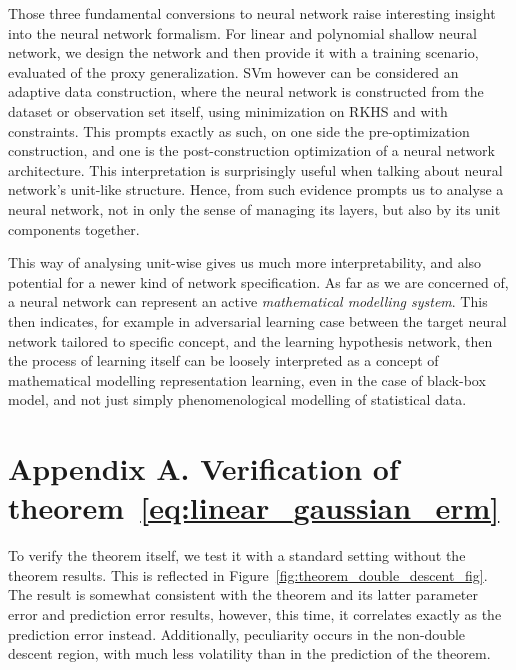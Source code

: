 \documentclass[10pt]{article} %
\begin{document}
Those three fundamental conversions to neural network raise interesting insight into the neural network formalism. For linear and polynomial shallow neural network, we design the network and then provide it with a training scenario, evaluated of the proxy generalization. SVm however can be considered an adaptive data construction, where the neural network is constructed from the dataset or observation set itself, using minimization on RKHS and with constraints. This prompts exactly as such, on one side the pre-optimization construction, and one is the post-construction optimization of a neural network architecture. This interpretation is surprisingly useful when talking about neural network's unit-like structure. Hence, from such evidence prompts us to analyse a neural network, not in only the sense of managing its layers, but also by its unit components together. 

This way of analysing unit-wise gives us much more interpretability, and also potential for a newer kind of network specification. As far as we are concerned of, a neural network can represent an active \textit{mathematical modelling system}. This then indicates, for example in adversarial learning case between the target neural network tailored to specific concept, and the learning hypothesis network, then the process of learning itself can be loosely interpreted as a concept of mathematical modelling representation learning, even in the case of black-box model, and not just simply phenomenological modelling of statistical data. 



\clearpage




\clearpage

\appendix
\section*{Appendix A. Verification of theorem~\ref{eq:linear_gaussian_erm}}

To verify the theorem itself, we test it with a standard setting without the theorem results. This is reflected in Figure~\ref{fig:theorem_double_descent_fig}. The result is somewhat consistent with the theorem and its latter parameter error and prediction error results, however, this time, it correlates exactly as the prediction error instead. Additionally, peculiarity occurs in the non-double descent region, with much less volatility than in the prediction of the theorem. 
\end{document}
